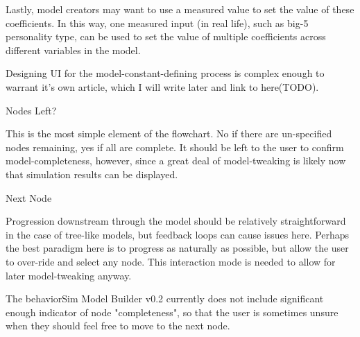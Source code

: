 Lastly, model creators may want to use a measured value to set the value of these coefficients. In this way, one measured input (in real life), such as big-5 personality type, can be used to set the value of multiple coefficients across different variables in the model.

Designing UI for the model-constant-defining process is complex enough to warrant it's own article, which I will write later and link to here(TODO).

Nodes Left?

This is the most simple element of the flowchart. No if there are un-specified nodes remaining, yes if all are complete. It should be left to the user to confirm model-completeness, however, since a great deal of model-tweaking is likely now that simulation results can be displayed.

Next Node

Progression downstream through the model should be relatively straightforward in the case of tree-like models, but feedback loops can cause issues here. Perhaps the best paradigm here is to progress as naturally as possible, but allow the user to over-ride and select any node. This interaction mode is needed to allow for later model-tweaking anyway. 

The behaviorSim Model Builder v0.2 currently does not include significant enough indicator of node "completeness", so that the user is sometimes unsure when they should feel free to move to the next node.
